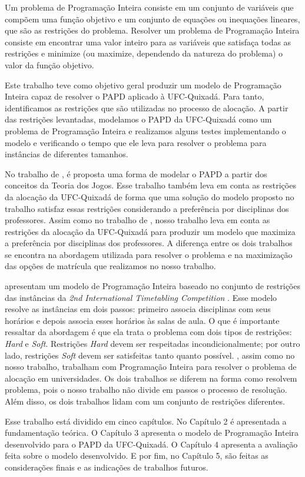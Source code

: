 Um problema de Programação Inteira consiste em um conjunto de variáveis que compõem uma função objetivo e um conjunto de equações ou inequações lineares, que são as restrições do problema. Resolver um problema de Programação Inteira consiste em encontrar uma valor inteiro para as variáveis que satisfaça todas as restrições e minimize (ou maximize, dependendo da natureza do problema) o valor da função objetivo.

Este trabalho teve como objetivo geral produzir um modelo de Programação Inteira capaz de resolver o PAPD aplicado à UFC-Quixadá. Para tanto, identificamos as restrições que são utilizadas no processo de alocação. A partir das restrições levantadas, modelamos o PAPD da UFC-Quixadá como um problema de Programação Inteira e realizamos alguns testes implementando o modelo e verificando o tempo que ele leva para resolver o problema para instâncias de diferentes tamanhos.

No trabalho de , é proposta uma forma de modelar o PAPD a partir dos conceitos da Teoria dos Jogos. Esse trabalho também leva em conta as restrições da alocação da UFC-Quixadá de forma que uma solução do modelo proposto no trabalho satisfaz essas restrições considerando a preferência por disciplinas dos professores. Assim como no trabalho de , nosso trabalho leva em conta as restrições da alocação da UFC-Quixadá para produzir um modelo que maximiza a preferência por disciplinas dos professores. A diferença entre os dois trabalhos se encontra na abordagem utilizada para resolver o problema e na maximização das opções de matrícula que realizamos no nosso trabalho. 

 apresentam um modelo de Programação Inteira baseado no conjunto de restrições das instâncias da \textit{2nd International Timetabling Competition} \cite{itc}. Esse modelo resolve as instâncias em dois passos: primeiro  associa disciplinas com seus horários e depois associa esses horários às salas de aula. O que é importante ressaltar da abordagem é que ela trata o problema com dois tipos de restrições: \textit{Hard} e \textit{Soft}. Restrições \textit{Hard} devem ser respeitadas incondicionalmente; por outro lado, restrições \textit{Soft} devem ser satisfeitas tanto quanto possível. , assim como no nosso trabalho, trabalham com Programação Inteira para resolver o problema de alocação em universidades. Os dois trabalhos se diferem na forma como resolvem problema, pois o nosso trabalho não divide em passos o processo de resolução. Além disso, os dois trabalhos lidam com um conjunto de restrições diferentes.

Esse trabalho está dividido em cinco capítulos. No Capítulo 2 é apresentada a fundamentação teórica. O Capítulo 3 apresenta o modelo de Programação Inteira desenvolvido para o PAPD da UFC-Quixadá. O Capítulo 4 apresenta a avaliação feita sobre o modelo desenvolvido. E por fim, no Capítulo 5, são feitas as considerações finais e as indicações de trabalhos futuros.

	